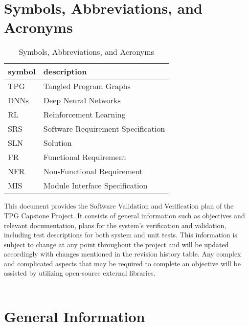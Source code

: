 \documentclass[12pt, titlepage]{article}
\begin{document}
\section{Symbols, Abbreviations, and Acronyms}

\renewcommand{\arraystretch}{1.2}
\begin{table}[h]
  \begin{tabular}{l l} 
    \toprule		
    \textbf{symbol} & \textbf{description}\\
    \midrule 
    TPG & Tangled Program Graphs\\
    DNNs & Deep Neural Networks\\
    RL & Reinforcement Learning\\
    SRS & Software Requirement Specification\\
    SLN & Solution\\
    FR & Functional Requirement\\
    NFR & Non-Functional Requirement\\
    MIS & Module Interface Specification\\
    \bottomrule
  \end{tabular}
  \caption{Symbols, Abbreviations, and Acronyms}
  \label{symbols}
\end{table}




\newpage


This document provides the Software Validation and Verification plan of the TPG Capstone Project. It consists of general information such as objectives and relevant documentation, plans for the system's verification and validation, including test descriptions for both system and unit tests. This information is subject to change at any point throughout the project and will be updated accordingly with changes mentioned in the revision history table.
Any complex and complicated aspects that may be required to complete an objective will be assisted by utilizing open-source external libraries.\\\\

\section{General Information}
\end{document}

